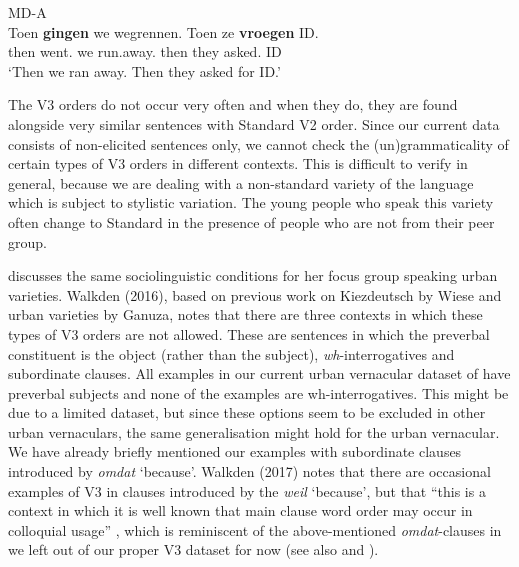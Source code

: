 \documentclass[output=paper]{langsci/langscibook}
\begin{document}
\ea\label{exdisV3} MD-A\\
    \gll Toen \textbf{gingen} we wegrennen. Toen ze \textbf{vroegen} ID.\\
    then went.\Pl{} we run.away.\Inf{} then they asked.\Pl{} ID\\
    \trans \enquote*{Then we ran away. Then they asked for ID.}
\z

\noindent The V3 orders do not occur very often and when they do, they are
found alongside very similar sentences with Standard  V2 order. Since our
current data consists of non-elicited sentences only, we cannot check the
(un)grammaticality of certain types of V3 orders in different contexts. This is
difficult to verify in general, because we are dealing with a non-standard
variety of the language which is subject to stylistic variation. The young
people who speak this variety often change to Standard  in the presence of
people who are not from their peer group.

\citet[109--130]{Ganuza:2008} discusses the same sociolinguistic conditions for
her focus group speaking  urban varieties. Walkden (2016), based on
previous work on Kiezdeutsch by Wiese and  urban varieties by Ganuza,
notes that there are three contexts in which these types of V3 orders are not
allowed. These are sentences in which the preverbal constituent is the object
(rather than the subject), \emph{wh}-interrogatives and subordinate clauses.
All examples in our current urban vernacular dataset of  have preverbal
subjects and none of the examples are wh-interrogatives. This might be due to a
limited dataset, but since these options seem to be excluded in other urban
vernaculars, the same generalisation might hold for the  urban vernacular.
We have already briefly mentioned our examples with subordinate clauses
introduced by \emph{omdat} `because'. Walkden (2017) notes that there are
occasional examples of V3 in clauses introduced by the  \emph{weil}
`because', but that \enquote{this is a context in which it is well known that
main clause word order may occur in colloquial usage} \citep{Walkden:2017},
which is reminiscent of the above-mentioned \emph{omdat}-clauses in  we
left out of our proper V3 dataset for now (see also
\citealt{AntomoSteinbach:2010} and \citealt{Reis:2013}).

\end{document}
